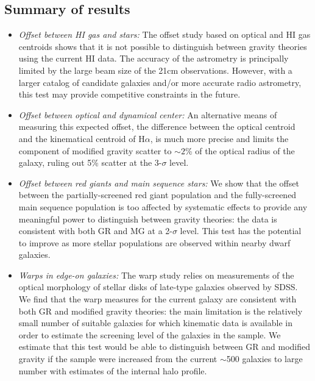 \documentclass[useAMS,usenatbib,twocolumn]{mn2e}
\newcommand{\ha}{H$\alpha$}
\begin{document}
\subsection{Summary of results}

\begin{itemize}
\item {\it Offset between HI gas and stars:}
The offset study based on optical and HI gas centroids shows that it is not
possible to distinguish between gravity theories using the current HI data. 
The accuracy of the astrometry is principally limited by the large beam size of
the 21cm observations.  However, with a larger catalog of candidate
galaxies and/or more accurate radio astrometry, this test may provide
competitive constraints in the future.

\item {\it Offset between optical and dynamical center:}
An alternative means of measuring this expected offset, the difference
between the optical centroid and the kinematical centroid of \ha{}, is
much more precise and limits the component of modified gravity scatter
to  $\sim 2$\% of the optical radius of the galaxy, ruling out 5\%
scatter at the 3-$\sigma$ level.

\item {\it Offset between red giants and main sequence stars:}
We show that the offset between the partially-screened red giant
population and the fully-screened main sequence population is too
affected by systematic effects to provide any meaningful power to distinguish
between gravity theories: the data is consistent with both GR and MG at
a 2-$\sigma$ level.  This test has the potential to improve as more stellar
populations are observed within nearby dwarf galaxies.

\item {\it Warps in edge-on galaxies:}
The warp study relies on measurements of the optical morphology of stellar
disks of late-type galaxies observed by SDSS.
We find that the warp measures for the current galaxy are
consistent with both GR and modified gravity theories: the main limitation
is the relatively small number of suitable galaxies for which kinematic data
is available in order to estimate the screening level of the galaxies in
the sample.  We estimate that this test would be able to
distinguish between GR and modified gravity if the sample were increased
from the current $\sim$500 galaxies to large number
with estimates of the internal halo profile.


\end{itemize}
\end{document}
